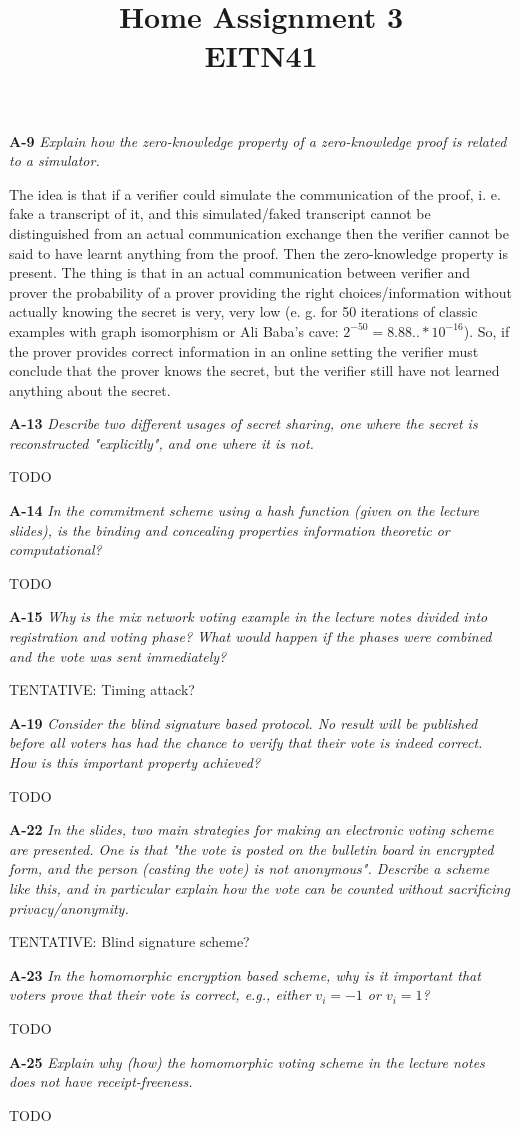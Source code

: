 \documentclass[a4paper]{article}
\title{Home Assignment 3 \\ EITN41}
\author{}
\date{}
\newcommand{\Q}[2]{ \vspace{10pt} \textbf{A-#1} \textit{#2} }
\newcommand{\A}[1]{ #1 }
\begin{document}
\maketitle

\Q{9} {
  Explain how the zero-knowledge property of a zero-knowledge proof is related to a simulator.
}

\A{
  The idea is that if a verifier could simulate the communication of the proof,
  i. e. fake a transcript of it, and this simulated/faked transcript cannot 
  be distinguished from an actual communication exchange then the verifier
  cannot be said to have learnt anything from the proof. Then the 
  zero-knowledge property is present. The thing is that in an actual
  communication between verifier and prover the probability of a prover
  providing the right choices/information without actually knowing the secret 
  is very, very low 
  (e. g. for 50 iterations of classic examples with graph isomorphism
  or Ali Baba's cave: $2^{-50} = 8.88.. * 10^{-16}$). So, if the prover
  provides correct information in an online setting the verifier
  must conclude that the prover knows the secret, but the verifier still
  have not learned anything about the secret. 
}

\Q{13} {
  Describe two different usages of secret sharing, one where the secret is reconstructed "explicitly", and one where it is not.
}

\A{
  TODO
}

\Q{14} {
  In the commitment scheme using a hash function (given on the lecture slides),
  is the \textnormal{binding} and
  \textnormal{concealing} properties information theoretic or computational?
}

\A{
  TODO
}

\Q{15} {
  Why is the mix network voting example in the lecture notes divided into 
  registration and voting
  phase? What would happen if the phases were combined and the vote was sent 
  immediately?
}

\A{
  TENTATIVE: Timing attack? 
}

\Q{19} {
  Consider the blind signature based protocol. No result will be published 
  before all voters has had the
  chance to verify that their vote is indeed correct. How is this important 
  property achieved?
  }

\A{
  TODO
}

\Q{22} {
  In the slides, two main strategies for making an electronic voting scheme are 
  presented. One is
  that "the vote is posted on the bulletin board in encrypted form, and the 
  person (casting the vote) is not
  anonymous". Describe a scheme like this, and in particular explain how the  
  vote can be counted without sacrificing privacy/anonymity.
}

\A{
  TENTATIVE: Blind signature scheme?
}

\Q{23} {
  In the homomorphic encryption based scheme, why is it important that voters 
  prove that their vote is correct, e.g., either $v_i = -1$ or $v_i = 1$?
}

\A{
  TODO
}

\Q{25} {
  Explain why (how) the homomorphic voting scheme in the lecture notes 
  does not have receipt-freeness.
}

\A{
  TODO
}
\end{document}
